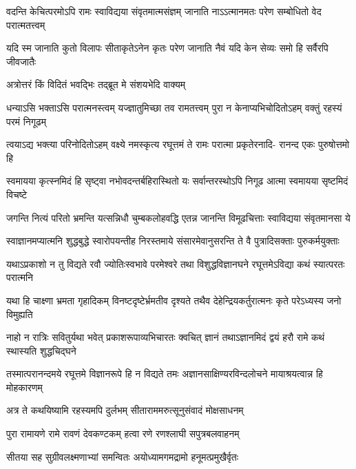 \fourlineindentedshloka
{वदन्ति केचित्परमोऽपि रामः}
{स्वाविद्यया संवृतमात्मसंज्ञम्}
{जानाति नाऽऽत्मानमतः परेण}
{सम्बोधितो वेद परात्मतत्त्वम्} %

\fourlineindentedshloka
{यदि स्म जानाति कुतो विलापः}
{सीताकृतेऽनेन कृतः परेण}
{जानाति नैवं यदि केन सेव्यः}
{समो हि सर्वैरपि जीवजातैः} %

\twolineshloka
{अत्रोत्तरं किं विदितं भवद्भिः}
{तद्ब्रूत मे संशयभेदि वाक्यम्} %


\fourlineindentedshloka
{धन्याऽसि भक्ताऽसि परात्मनस्त्वम्}
{यज्ज्ञातुमिच्छा तव रामतत्त्वम्}
{पुरा न केनाप्यभिचोदितोऽहम्}
{वक्तुं रहस्यं परमं निगूढम्} %

\fourlineindentedshloka
{त्वयाऽद्य भक्त्या परिनोदितोऽहम्}
{वक्ष्ये नमस्कृत्य रघूत्तमं ते}
{रामः परात्मा प्रकृतेरनादि-}
{रानन्द एकः पुरुषोत्तमो हि} %

\fourlineindentedshloka
{स्वमायया कृत्स्नमिदं हि सृष्ट्वा}
{नभोवदन्तर्बहिरास्थितो यः}
{सर्वान्तरस्थोऽपि निगूढ आत्मा}
{स्वमायया सृष्टमिदं विचष्टे} %

\fourlineindentedshloka
{जगन्ति नित्यं परितो भ्रमन्ति}
{यत्सन्निधौ चुम्बकलोहवद्धि}
{एतन्न जानन्ति विमूढचित्ताः}
{स्वाविद्यया संवृतमानसा ये} %

\fourlineindentedshloka
{स्वाज्ञानमप्यात्मनि शुद्धबुद्धे}
{स्वारोपयन्तीह निरस्तमाये}
{संसारमेवानुसरन्ति ते वै}
{पुत्रादिसक्ताः पुरुकर्मयुक्ताः} %

\fourlineindentedshloka
{यथाऽप्रकाशो न तु विद्यते रवौ}
{ज्योतिःस्वभावे परमेश्वरे तथा}
{विशुद्धविज्ञानघने रघूत्तमेऽविद्या}
{कथं स्यात्परतः परात्मनि} %

\fourlineindentedshloka
{यथा हि चाक्ष्णा भ्रमता गृहादिकम्}
{विनष्टदृष्टेर्भ्रमतीव दृश्यते}
{तथैव देहेन्द्रियकर्तुरात्मनः}
{कृते परेऽध्यस्य जनो विमुह्यति} %

\fourlineindentedshloka
{नाहो न रात्रिः सवितुर्यथा भवेत्}
{प्रकाशरूपाव्यभिचारतः क्वचित्}
{ज्ञानं तथाऽज्ञानमिदं द्वयं हरौ}
{रामे कथं स्थास्यति शुद्धचिद्घने} %

\fourlineindentedshloka
{तस्मात्परानन्दमये रघूत्तमे}
{विज्ञानरूपे हि न विद्यते तमः}
{अज्ञानसाक्षिण्यरविन्दलोचने}
{मायाश्रयत्वान्न हि मोहकारणम्} %

\twolineshloka
{अत्र ते कथयिष्यामि रहस्यमपि दुर्लभम्}
{सीताराममरुत्सूनुसंवादं मोक्षसाधनम्} %

\twolineshloka
{पुरा रामायणे रामे रावणं देवकण्टकम्}
{हत्वा रणे रणश्लाघी सपुत्रबलवाहनम्} %

\twolineshloka
{सीतया सह सुग्रीवलक्ष्मणाभ्यां समन्वितः}
{अयोध्यामगमद्रामो हनूमत्प्रमुखैर्वृतः} %

